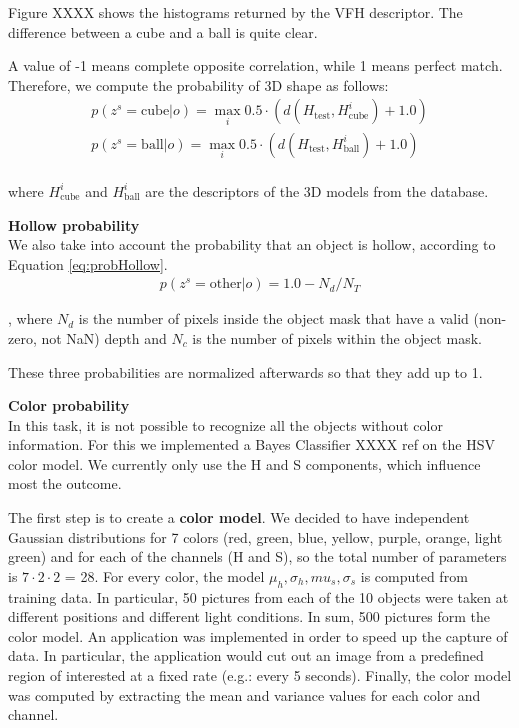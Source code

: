 Figure XXXX shows the histograms returned by the VFH descriptor. The difference between a cube and a ball is quite clear. 

A value of -1 means complete opposite correlation, while 1 means perfect match. Therefore, we compute the probability of 3D shape as follows:
\begin{align}
p(z^s = \text{cube} | o) = \max_i 0.5\cdot(d(H_{\text{test}}, H_{\text{cube}}^i) + 1.0) \\
p(z^s = \text{ball} | o) = \max_i 0.5\cdot(d(H_{\text{test}}, H_{\text{ball}}^i) + 1.0) \\
\end{align}

where $H_{\text{cube}}^i$ and $H_{\text{ball}}^i$ are the descriptors of the 3D models from the database.

\textbf{Hollow probability}\\
We also take into account the probability that an object is hollow, according to Equation \ref{eq:probHollow}.
\begin{align}
\label{eq:probHollow}
p(z^s = \text{other} | o) = 1.0 - N_d/N_T
\end{align}

, where $N_d$ is the number of pixels inside the object mask that have a valid (non-zero, not NaN) depth and $N_c$ is the number of pixels within the object mask.

These three probabilities are normalized afterwards so that they add up to 1.

\textbf{Color probability}\\
In this task, it is not possible to recognize all the objects without color information. For this we implemented a Bayes Classifier XXXX ref on the HSV color model. We currently only use the H and S components, which influence most the outcome. 

The first step is to create a \textbf{color model}. We decided to have independent Gaussian distributions for 7 colors (red, green, blue, yellow, purple, orange, light green) and for each of the channels (H and S), so the total number of parameters is $7 \cdot 2 \cdot 2$ = 28. For every color, the model ${\mu_h, \sigma_h, mu_s, \sigma_s}$ is computed from training data. In particular, 50 pictures from each of the 10 objects were taken at different positions and different light conditions. In sum, 500 pictures form the color model. An application was implemented in order to speed up the capture of data. In particular, the application would cut out an image from a predefined region of interested at a fixed rate (e.g.: every 5 seconds). Finally, the color model was computed by extracting the mean and variance values for each color and channel.

